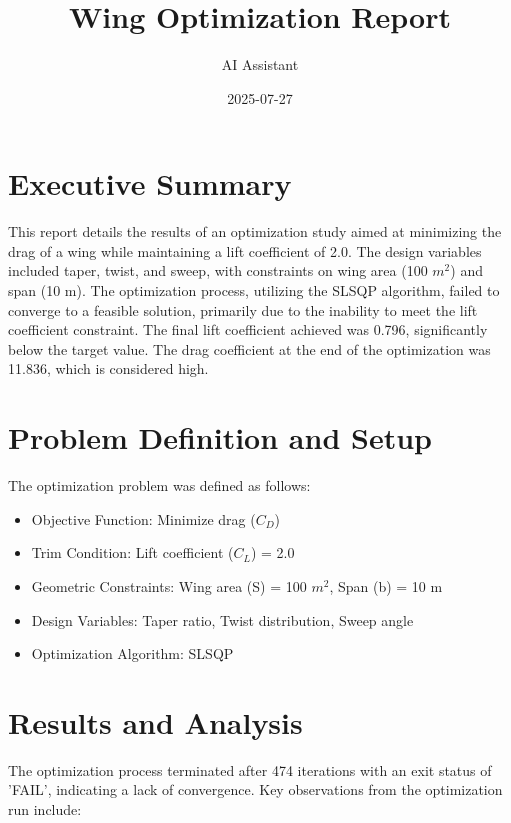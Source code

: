 \documentclass{article}
\title{Wing Optimization Report}
\author{AI Assistant}
\date{2025-07-27}
\begin{document}
\maketitle

\section{Executive Summary}
This report details the results of an optimization study aimed at minimizing the drag of a wing while maintaining a lift coefficient of 2.0. The design variables included taper, twist, and sweep, with constraints on wing area (100 $m^2$) and span (10 m). The optimization process, utilizing the SLSQP algorithm, failed to converge to a feasible solution, primarily due to the inability to meet the lift coefficient constraint. The final lift coefficient achieved was 0.796, significantly below the target value. The drag coefficient at the end of the optimization was 11.836, which is considered high.

\section{Problem Definition and Setup}
The optimization problem was defined as follows:
\begin{itemize}
    \item Objective Function: Minimize drag ($C_D$)
    \item Trim Condition: Lift coefficient ($C_L$) = 2.0
    \item Geometric Constraints: Wing area (S) = 100 $m^2$, Span (b) = 10 m
    \item Design Variables: Taper ratio, Twist distribution, Sweep angle
    \item Optimization Algorithm: SLSQP
\end{itemize}

\section{Results and Analysis}
The optimization process terminated after 474 iterations with an exit status of 'FAIL', indicating a lack of convergence. Key observations from the optimization run include:
\end{document}
